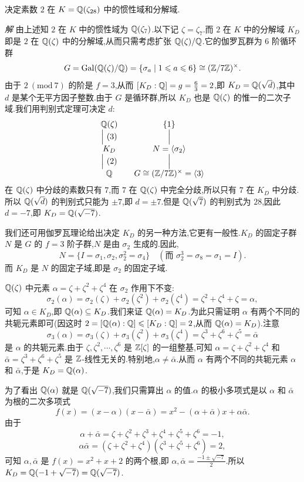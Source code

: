 \begin{example}\label{ex:ch2-s3-4-1}
决定素数 $2$ 在 $K=\mathbb{Q}(\zeta_{28})$ 中的惯性域和分解域.

\emph{解} 由上述知 $2$ 在 $K$ 中的惯性域为 $\mathbb{Q}(\zeta_7)$.以下记 $\zeta=\zeta_7$.而 $2$ 在 $K$ 中的分解域 $K_D$ 即是 $2$ 在 $\mathbb{Q}(\zeta)$ 中的分解域,从而只需考虑扩张 $\mathbb{Q}(\zeta)/\mathbb{Q}$.它的伽罗瓦群为 $6$ 阶循环群
\[
  G=\operatorname{Gal}(\mathbb{Q}(\zeta)/\mathbb{Q})=\{\sigma_a\mid 1\leqslant a\leqslant 6\}\cong(\mathbb{Z}/7\mathbb{Z})^\times.
\]
由于 $2\ (\mathrm{mod}\ 7)$ 的阶是 $f=3$,从而 $[K_D:\mathbb{Q}]=g=\frac{6}{3}=2$,即 $K_D=\mathbb{Q}(\sqrt{d})$,其中 $d$ 是某个无平方因子整数.由于 $G$ 是循环群,所以 $K_D$ 也是 $\mathbb{Q}(\zeta)$ 的惟一的二次子域.我们用判别式定理可决定 $d$:
\[
  \begin{array}{ccc}
    \mathbb{Q}(\zeta) & & \{1\}\\
    \Big\vert\ (3) & & \Big\vert\\
    K_D & & N=\langle\sigma_2\rangle\\
    \Big\vert\ (2) & & \Big\vert\\
    \mathbb{Q} & & G\cong(\mathbb{Z}/7\mathbb{Z})^\times=\langle 3\rangle
  \end{array}
\]
在 $\mathbb{Q}(\zeta)$ 中分歧的素数只有 $7$,而 $7$ 在 $\mathbb{Q}(\zeta)$ 中完全分歧,所以只有 $7$ 在 $K_D$ 中分歧.所以 $\mathbb{Q}(\sqrt{d})$ 的判别式只能为 $\pm 7$,即 $d=\pm 7$.但是 $\mathbb{Q}(\sqrt{7})$ 的判别式为 $28$,因此 $d=-7$,即 $K_D=\mathbb{Q}(\sqrt{-7})$.

我们还可用伽罗瓦理论给出决定 $K_D$ 的另一种方法,它更有一般性.$K_D$ 的固定子群 $N$ 是 $G$ 的 $f=3$ 阶子群,$N$ 是由 $\sigma_2$ 生成的.因此,
\[
  N=\{I=\sigma_1,\sigma_2,\sigma_2^2=\sigma_4\}\quad (\text{而 }\sigma_2^3=\sigma_8=\sigma_1=I).
\]
而 $K_D$ 是 $N$ 的固定子域,即是 $\sigma_2$ 的固定子域.

$\mathbb{Q}(\zeta)$ 中元素 $\alpha=\zeta+\zeta^2+\zeta^4$ 在 $\sigma_2$ 作用下不变:
\[
  \sigma_2(\alpha)=\sigma_2(\zeta)+\sigma_2(\zeta^2)+\sigma_2(\zeta^4)=\zeta^2+\zeta^4+\zeta=\alpha,
\]
可知 $\alpha\in K_D$,即 $\mathbb{Q}(\alpha)\subseteq K_D$.我们来证 $\mathbb{Q}(\alpha)=K_D$.为此只需证明 $\alpha$ 有两个不同的共轭元素即可(因这时 $2=[\mathbb{Q}(\alpha):\mathbb{Q}]\leqslant[K_D:\mathbb{Q}]=2$,从而 $\mathbb{Q}(\alpha)=K_D$).注意
\[
  \sigma_3(\alpha)=\sigma_3(\zeta)+\sigma_3(\zeta^2)+\sigma_3(\zeta^4)=\zeta^3+\zeta^6+\zeta^5=\bar{\alpha}
\]
是 $\alpha$ 的共轭元素.由于 $\zeta,\zeta^2,\cdots,\zeta^6$ 是 $\mathbb{Z}[\zeta]$ 的一组整基,可知 $\alpha=\zeta+\zeta^2+\zeta^4$ 和 $\bar{\alpha}=\zeta^3+\zeta^6+\zeta^5$ 是 $\mathbb{Z}$-线性无关的.特别地,$\alpha\neq\bar{\alpha}$.从而 $\alpha$ 有两个不同的共轭元素 $\alpha$ 和 $\bar{\alpha}$,于是 $K_D=\mathbb{Q}(\alpha)$.

为了看出 $\mathbb{Q}(\alpha)$ 就是 $\mathbb{Q}(\sqrt{-7})$,我们只需算出 $\alpha$ 的值.$\alpha$ 的极小多项式是以 $\alpha$ 和 $\bar{\alpha}$ 为根的二次多项式
\[
  f(x)=(x-\alpha)(x-\bar{\alpha})=x^2-(\alpha+\bar{\alpha})x+\alpha\bar{\alpha}.
\]
由于
\[
  \alpha+\bar{\alpha}=\zeta+\zeta^2+\zeta^3+\zeta^4+\zeta^5+\zeta^6=-1,
\]
\[
  \alpha\bar{\alpha}=(\zeta+\zeta^2+\zeta^4)(\zeta^3+\zeta^5+\zeta^6)=2,
\]
可知 $\alpha,\bar{\alpha}$ 是 $f(x)=x^2+x+2$ 的两个根,即 $\alpha,\bar{\alpha}=\frac{-1\pm\sqrt{-7}}{2}$.所以 $K_D=\mathbb{Q}(-1+\sqrt{-7})=\mathbb{Q}(\sqrt{-7})$.


\end{example}
